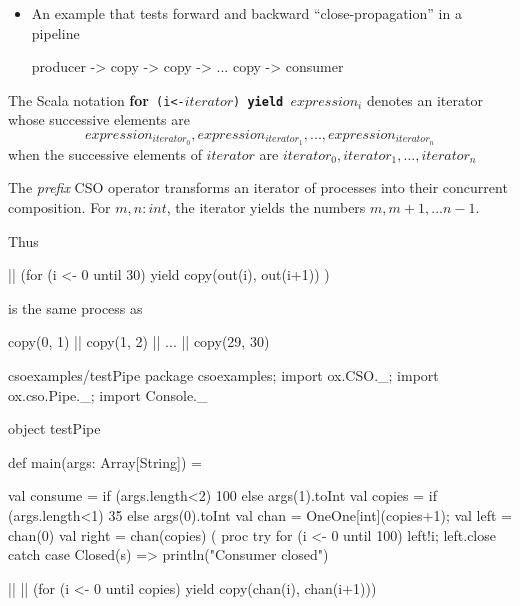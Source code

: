 \documentclass{concdistfoils}
\begin{document}
\begin{slide}
\begin{itemize}
\item An example that tests forward and backward ``close-propagation'' in a pipeline
\begin{scala}
                producer -> copy -> copy -> ... copy -> consumer
\end{scala}
\end{itemize}
\begin{note}
The Scala notation \textbf{for}\texttt{ (i<-$iterator$) \textbf{yield} $expression_i$}
denotes an iterator whose successive elements are 
$$
        expression_{iterator_0}, 
        expression_{iterator_1}, ..., 
        expression_{iterator_n}
$$
when the successive elements of 
$iterator$ are $iterator_0, iterator_1, ..., iterator_n$

The \textit{prefix} CSO operator \SCALA{||} transforms an iterator of processes
into their concurrent composition. For $m, n:int$, the iterator  yields 
the numbers $m, m+1, ... n-1$.

Thus
\begin{scala}
    || (for (i <- 0 until 30) yield copy(out(i), out(i+1)) )
\end{scala}
is the same process as
\begin{scala}
    copy(0, 1) || copy(1, 2) || ... || copy(29, 30)
\end{scala}
\end{note}
\begin{obj}{csoexamples/testPipe}
package csoexamples; import ox.CSO._; import ox.cso.Pipe._; import Console._

object testPipe
{ def main(args: Array[String]) =
  { val consume = if (args.length<2) 100 else args(1).toInt
    val copies  = if (args.length<1) 35  else args(0).toInt
    val chan    = OneOne[int](copies+1); 
    val left    = chan(0)
    val right   = chan(copies)
    (  proc { try { for (i <- 0 until 100) left!i; left.close } 
                    catch { case Closed(s) => println("Consumer closed") }} 
                                                        
    || || (for (i <- 0 until copies) yield copy(chan(i), chan(i+1)))    
    
}}
\end{obj}
\end{slide}
\end{document}
